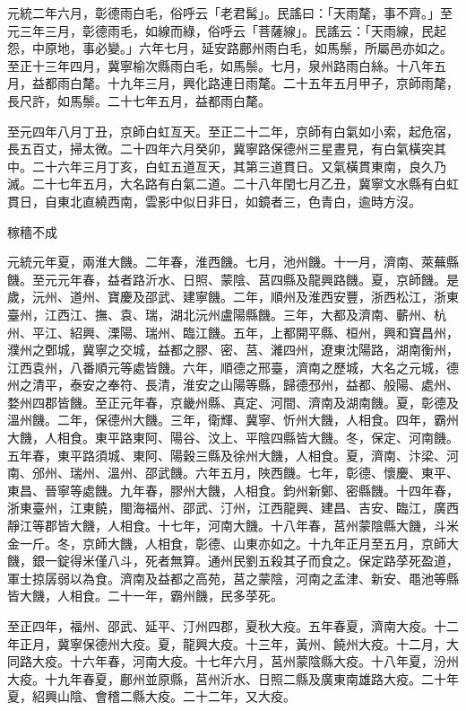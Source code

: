 \begin{pinyinscope}
 元統二年六月，彰德雨白毛，俗呼云「老君髯」。民謠曰：「天雨氂，事不齊。」至元三年三月，彰德雨毛，如線而綠，俗呼云「菩薩線」。民謠云：「天雨線，民起怨，中原地，事必變。」六年七月，延安路鄜州雨白毛，如馬鬃，所屬邑亦如之。至正十三年四月，冀寧榆次縣雨白毛，如馬鬃。七月，泉州路雨白絲。十八年五月，益都雨白氂。十九年三月，興化路連日雨氂。二十五年五月甲子，京師雨氂，長尺許，如馬鬃。二十七年五月，益都雨白氂。



 至元四年八月丁丑，京師白虹亙天。至正二十二年，京師有白氣如小索，起危宿，長五百丈，掃太微。二十四年六月癸卯，冀寧路保德州三星晝見，有白氣橫突其中。二十六年三月丁亥，白虹五道亙天，其第三道貫日。又氣橫貫東南，良久乃滅。二十七年五月，大名路有白氣二道。二十八年閏七月乙丑，冀寧文水縣有白虹貫日，自東北直繞西南，雲影中似日非日，如鏡者三，色青白，逾時方沒。



 稼穡不成



 元統元年夏，兩淮大饑。二年春，淮西饑。七月，池州饑。十一月，濟南、萊蕪縣饑。至元元年春，益者路沂水、日照、蒙陰、莒四縣及龍興路饑。夏，京師饑。是歲，沅州、道州、寶慶及邵武、建寧饑。二年，順州及淮西安豐，浙西松江，浙東臺州，江西江、撫、袁、瑞，湖北沅州盧陽縣饑。三年，大都及濟南、蘄州、杭州、平江、紹興、溧陽、瑞州、臨江饑。五年，上都開平縣、桓州，興和寶昌州，濮州之鄄城，冀寧之交城，益都之膠、密、莒、濰四州，遼東沈陽路，湖南衡州，江西袁州，八番順元等處皆饑。六年，順德之邢臺，濟南之歷城，大名之元城，德州之清平，泰安之奉符、長清，淮安之山陽等縣，歸德邳州，益都、般陽、處州、婺州四郡皆饑。至正元年春，京畿州縣、真定、河間、濟南及湖南饑。夏，彰德及溫州饑。二年，保德州大饑。三年，衛輝、冀寧、忻州大饑，人相食。四年，霸州大饑，人相食。東平路東阿、陽谷、汶上、平陰四縣皆大饑。冬，保定、河南饑。五年春，東平路須城、東阿、陽穀三縣及徐州大饑，人相食。夏，濟南、汴梁、河南、邠州、瑞州、溫州、邵武饑。六年五月，陜西饑。七年，彰德、懷慶、東平、東昌、晉寧等處饑。九年春，膠州大饑，人相食。鈞州新鄭、密縣饑。十四年春，浙東臺州，江東饒，閩海福州、邵武、汀州，江西龍興、建昌、吉安、臨江，廣西靜江等郡皆大饑，人相食。十七年，河南大饑。十八年春，莒州蒙陰縣大饑，斗米金一斤。冬，京師大饑，人相食，彰德、山東亦如之。十九年正月至五月，京師大饑，銀一錠得米僅八斗，死者無算。通州民劉五殺其子而食之。保定路莩死盈道，軍士掠孱弱以為食。濟南及益都之高苑，莒之蒙陰，河南之孟津、新安、黽池等縣皆大饑，人相食。二十一年，霸州饑，民多莩死。



 至正四年，福州、邵武、延平、汀州四郡，夏秋大疫。五年春夏，濟南大疫。十二年正月，冀寧保德州大疫。夏，龍興大疫。十三年，黃州、饒州大疫。十二月，大同路大疫。十六年春，河南大疫。十七年六月，莒州蒙陰縣大疫。十八年夏，汾州大疫。十九年春夏，鄜州並原縣，莒州沂水、日照二縣及廣東南雄路大疫。二十年夏，紹興山陰、會稽二縣大疫。二十二年，又大疫。




\end{pinyinscope}
